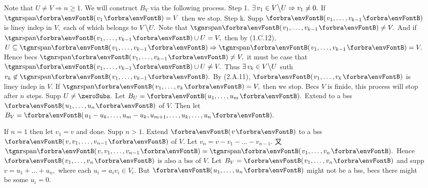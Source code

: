\TextB{\vspace{0pt}}
Note that $U\neq V\Rightarrow n\geqslant 1.$ We will construct $B_V$ via the following process.\TextB{}
{\tgbfx Step 1.} $\exists\,v_1\in V\big\backslash U\Rightarrow v_1\neq 0.$ If $\Span{v_1}=V$ then we stop.\TextB{}
{\tgbfx Step k.} Supp $\Par{v_1,\dots,v_{k-1}}$ is liney indep in $V,$ each of which belongs to $V\big\backslash U.$\TextB{}
 Note that $\Span{v_1,\dots,v_{k-1}}\neq V.$ And if $\Span{v_1,\dots,v_{k-1}}\cup U=V,$ then by (1.C.12),\TextB{}
  $U\subseteq \Span{v_1,\dots,v_{k-1}}\Rightarrow\Span{v_1,\dots,v_{k-1}}=V.$\TextB{}
 Hence becs $\Span{v_1,\dots,v_{k-1}}\neq V,$ it must be case that $\Span{v_1,\dots,v_{k-1}}\cup U\neq V.$\TextB{}
 Thus $\exists\,v_k\in V\big\backslash U$ suth $v_k\not\in\Span{v_1,\dots,v_{k-1}}.$\TextB{}
 By (2.A.11), $\Par{v_1,\dots,v_k}$ is liney indep in $V$. If $\Span{v_1,\dots,v_k}=V,$ then we stop.\TextB{}
Becs $V$ is finide, this process will stop after $n$ steps.\PfEnd\vspace{4pt}\TextB{}
\Or Supp $U\neq\zeroSubs.$ Let $B_U=\Par{u_1,\dots,u_m}.$ Extend to a bss $\Par{u_1,\dots,u_n}$ of $V.$\TextB{}
\Blind{\Or}Then let $B_V=\Par{u_1-u_k,\dots,u_m-u_k,u_{m+1},\dots,u_k,\dots,u_n}.$\PfEnd
\SepLine\ChEnd
\pagebreak


\vspace{4pt}



If $n=1$ then let $v_1=v$ and done. Supp $n>1.$\parSol{}
Extend $\Par{v}$ to a bss $\Par{v,v_1,\dots,v_{n-1}}$ of $V.$ Let $v_n=v-v_1-\dots-v_{n-1}.$\parSol{}
又 $\Span{v,v_1,\dots,v_{n-1}}=\Span{v_1,\dots,v_n}.$ Hence $\Par{v_1,\dots,v_n}$ is also a bss of $V.$\PfEnd\vspace{4pt}
\AComm Let $B_V=\Par{v_1,\dots,v_n}$ and supp $v=u_1+\dots+u_n,$ where each $u_i=a_i v_i\in V_{\!i}.$\parCom
But $\Par{u_1,\dots,u_n}$ might not be a bss, becs there might be some $u_i=0.$\vspace{-2pt}
\SepLine

